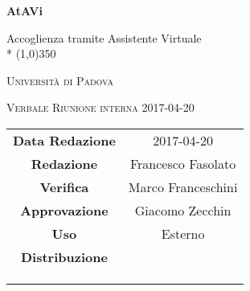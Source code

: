 \documentclass[a4paper,12pt]{article}
\author{Francesco Fasolato}
\date{20/04/2017}
\begin{document}
\begin{titlepage}
	\centering
	{\huge\bfseries AtAVi\par}
	Accoglienza tramite Assistente Virtuale \\*
	\line(1,0){350} \\
	{\scshape\LARGE Università di Padova \par}
	\vspace{1cm}
	{\scshape\Large Verbale Riunione interna 2017-04-20\par}
	\vspace{1.5cm}
	\logo
	\vspace{2cm}	
	\vfill \vfill
	\begin{tabular}{c|c}
		{\hfill\textbf{Data Redazione}} 		& 2017-04-20	\\
		{\hfill\textbf{Redazione}} 				& Francesco Fasolato		\\
		{\hfill\textbf{Verifica}} 				& Marco Franceschini \\
		{\hfill\textbf{Approvazione}} 			& Giacomo Zecchin  \\
		{\hfill\textbf{Uso}} 					& Esterno		\\
		{\hfill\textbf{Distribuzione}} 			& \kpanic \\ & \vardanega \\ & \cardin \\ & \prop \\
	\end{tabular}
\end{titlepage}

	\pagestyle{myfront}
	\newpage
	\tableofcontents
	
	\label{LastFrontPage}
	
	\newpage
	\pagestyle{mymain}
		
		
		
		
		
		
		
		
	
	\label{LastPage}
\end{document}
